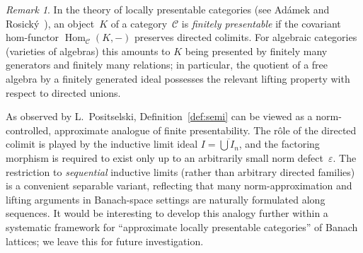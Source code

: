 \documentclass[11pt]{amsart}
\numberwithin{equation}{section}
\theoremstyle{definition}
\theoremstyle{remark}
\newtheorem{remark}[theorem]{Remark}
\theoremstyle{plain}
\DeclareMathOperator{\Hom}{Hom}
\begin{document}
\begin{remark}\label{rem:finitely-presentable}
In the theory of locally presentable categories
(see Ad\'amek and Rosick\'y~\cite[Definition~1.1]{adamek-rosicky}),
an object~$K$ of a category~$\mathcal C$ is \emph{finitely presentable}
if the covariant hom-functor
$\Hom_{\mathcal C}(K,{-})$ preserves directed colimits.
For algebraic categories (varieties of algebras) this amounts to
$K$ being presented by finitely many generators
and finitely many relations;
in particular, the quotient of a free algebra by a finitely generated
ideal possesses the relevant lifting property with respect to directed unions.

As observed by L.~Positselski, Definition~\ref{def:semi} can be viewed as a
norm-controlled, approximate analogue of finite presentability.
The r\^ole of the directed colimit is played by
the inductive limit ideal $I=\overline{\bigcup I_n}$,
and the factoring morphism is required to exist only up to
an arbitrarily small norm defect~$\varepsilon$.
The restriction to \emph{sequential} inductive limits (rather than arbitrary directed families)
is a convenient separable variant, reflecting that many norm-approximation and lifting arguments
in Banach-space settings are naturally formulated along sequences.
It would be interesting to develop this analogy further within a systematic framework for
``approximate locally presentable categories'' of Banach lattices;
we leave this for future investigation.
\end{remark}
\end{document}
